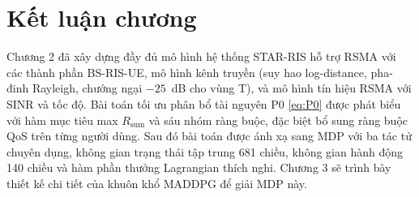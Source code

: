 \section*{Kết luận chương}

Chương 2 đã xây dựng đầy đủ mô hình hệ thống STAR-RIS hỗ trợ RSMA với
các thành phần BS-RIS-UE, mô hình kênh truyền (suy hao log-distance,
pha-đinh Rayleigh, chướng ngại $-25$~dB cho vùng T), và mô hình tín hiệu
RSMA với SINR và tốc độ. Bài toán tối ưu phân bổ tài nguyên P0
\eqref{eq:P0} được phát biểu với hàm mục tiêu max $R_{\text{sum}}$ và sáu
nhóm ràng buộc, đặc biệt bổ sung ràng buộc QoS trên từng người dùng.
Sau đó bài toán được ánh xạ sang MDP với ba tác tử chuyên dụng, không gian
trạng thái tập trung 681 chiều, không gian hành động 140 chiều và hàm phần thưởng
Lagrangian thích nghi. Chương 3 sẽ trình bày thiết kế chi tiết của khuôn
khổ MADDPG để giải MDP này.
